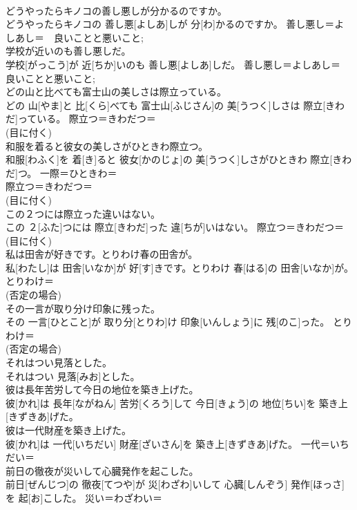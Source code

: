\documentclass[8pt]{extreport}
\begin{document}
\begin{CJK}{UTF8}{min}
\\	どうやったらキノコの善し悪しが分かるのですか。	
\\	どうやったらキノコの 善し悪[よしあ]しが 分[わ]かるのですか。	善し悪し＝よしあし＝　良いことと悪いこと; 
\\	学校が近いのも善し悪しだ。	
\\	学校[がっこう]が 近[ちか]いのも 善し悪[よしあ]しだ。	善し悪し＝よしあし＝　良いことと悪いこと; 
\\	どの山と比べても富士山の美しさは際立っている。	
\\	どの 山[やま]と 比[くら]べても 富士山[ふじさん]の 美[うつく]しさは 際立[きわだ]っている。	際立つ＝きわだつ＝ 
\\	(目に付く) 
\\	和服を着ると彼女の美しさがひときわ際立つ。	
\\	和服[わふく]を 着[き]ると 彼女[かのじょ]の 美[うつく]しさがひときわ 際立[きわだ]つ。	一際＝ひときわ＝ 
\\	際立つ＝きわだつ＝ 
\\	(目に付く) 
\\	この２つには際立った違いはない。	
\\	この ２[ふた]つには 際立[きわだ]った 違[ちが]いはない。	際立つ＝きわだつ＝ 
\\	(目に付く) 
\\	私は田舎が好きです。とりわけ春の田舎が。	
\\	私[わたし]は 田舎[いなか]が 好[す]きです。とりわけ 春[はる]の 田舎[いなか]が。	とりわけ＝ 
\\	(否定の場合) 
\\	その一言が取り分け印象に残った。	
\\	その 一言[ひとこと]が 取り分[とりわ]け 印象[いんしょう]に 残[のこ]った。	とりわけ＝ 
\\	(否定の場合) 
\\	それはつい見落とした。	
\\	それはつい 見落[みお]とした。	
\\	彼は長年苦労して今日の地位を築き上げた。	
\\	彼[かれ]は 長年[ながねん] 苦労[くろう]して 今日[きょう]の 地位[ちい]を 築き上[きずきあ]げた。	
\\	彼は一代財産を築き上げた。	
\\	彼[かれ]は 一代[いちだい] 財産[ざいさん]を 築き上[きずきあ]げた。	一代＝いちだい＝ 
\\	前日の徹夜が災いして心臓発作を起こした。	
\\	前日[ぜんじつ]の 徹夜[てつや]が 災[わざわ]いして 心臓[しんぞう] 発作[ほっさ]を 起[お]こした。	災い＝わざわい＝ 

\end{CJK}
\end{document}
